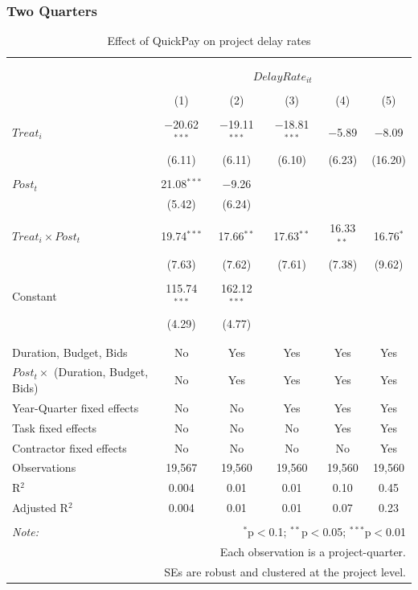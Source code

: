 \documentclass[
]{article}
\begin{document}
\hypertarget{two-quarters-5}{%
\subsubsection{Two Quarters}\label{two-quarters-5}}

\begin{table}[H] \centering 
  \caption{Effect of QuickPay on project delay rates} 
  \label{} 
\small 
\begin{tabular}{@{\extracolsep{-2pt}}lccccc} 
\\[-1.8ex]\hline 
\hline \\[-1.8ex] 
\\[-1.8ex] & \multicolumn{5}{c}{$DelayRate_{it}$} \\ 
\\[-1.8ex] & (1) & (2) & (3) & (4) & (5)\\ 
\hline \\[-1.8ex] 
 $Treat_i$ & $-$20.62$^{***}$ & $-$19.11$^{***}$ & $-$18.81$^{***}$ & $-$5.89 & $-$8.09 \\ 
  & (6.11) & (6.11) & (6.10) & (6.23) & (16.20) \\ 
  & & & & & \\ 
 $Post_t$ & 21.08$^{***}$ & $-$9.26 &  &  &  \\ 
  & (5.42) & (6.24) &  &  &  \\ 
  & & & & & \\ 
 $Treat_i \times Post_t$ & 19.74$^{***}$ & 17.66$^{**}$ & 17.63$^{**}$ & 16.33$^{**}$ & 16.76$^{*}$ \\ 
  & (7.63) & (7.62) & (7.61) & (7.38) & (9.62) \\ 
  & & & & & \\ 
 Constant & 115.74$^{***}$ & 162.12$^{***}$ &  &  &  \\ 
  & (4.29) & (4.77) &  &  &  \\ 
  & & & & & \\ 
\hline \\[-1.8ex] 
Duration, Budget, Bids & No & Yes & Yes & Yes & Yes \\ 
$Post_t \times$  (Duration, Budget, Bids) & No & Yes & Yes & Yes & Yes \\ 
Year-Quarter fixed effects & No & No & Yes & Yes & Yes \\ 
Task fixed effects & No & No & No & Yes & Yes \\ 
Contractor fixed effects & No & No & No & No & Yes \\ 
Observations & 19,567 & 19,560 & 19,560 & 19,560 & 19,560 \\ 
R$^{2}$ & 0.004 & 0.01 & 0.01 & 0.10 & 0.45 \\ 
Adjusted R$^{2}$ & 0.004 & 0.01 & 0.01 & 0.07 & 0.23 \\ 
\hline 
\hline \\[-1.8ex] 
\textit{Note:}  & \multicolumn{5}{r}{$^{*}$p$<$0.1; $^{**}$p$<$0.05; $^{***}$p$<$0.01} \\ 
 & \multicolumn{5}{r}{Each observation is a project-quarter.} \\ 
 & \multicolumn{5}{r}{SEs are robust and clustered at the project level.} \\ 
\end{tabular} 
\end{table}
\end{document}
